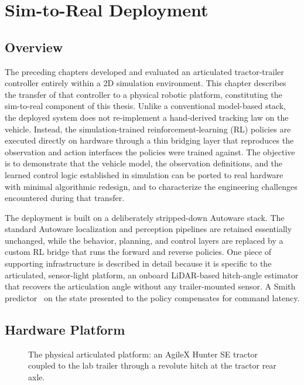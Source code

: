 \chapter{Sim-to-Real Deployment}
\label{ch:sim_to_real}

\section{Overview}

The preceding chapters developed and evaluated an articulated tractor-trailer controller entirely within a 2D simulation environment. This chapter describes the transfer of that controller to a physical robotic platform, constituting the sim-to-real component of this thesis. Unlike a conventional model-based stack, the deployed system does not re-implement a hand-derived tracking law on the vehicle. Instead, the simulation-trained reinforcement-learning (RL) policies are executed directly on hardware through a thin bridging layer that reproduces the observation and action interfaces the policies were trained against. The objective is to demonstrate that the vehicle model, the observation definitions, and the learned control logic established in simulation can be ported to real hardware with minimal algorithmic redesign, and to characterize the engineering challenges encountered during that transfer.

The deployment is built on a deliberately stripped-down Autoware stack. The standard Autoware localization and perception pipelines are retained essentially unchanged, while the behavior, planning, and control layers are replaced by a custom RL bridge that runs the forward and reverse policies. One piece of supporting infrastructure is described in detail because it is specific to the articulated, sensor-light platform, an onboard LiDAR-based hitch-angle estimator that recovers the articulation angle without any trailer-mounted sensor. A Smith predictor~\cite{smith1957closer} on the state presented to the policy compensates for command latency.

\section{Hardware Platform}

\begin{figure}[t]
  \centering
  \caption{The physical articulated platform: an AgileX Hunter SE tractor coupled to the lab trailer through a revolute hitch at the tractor rear axle.}
  \label{fig:hw_platform}
\end{figure}


